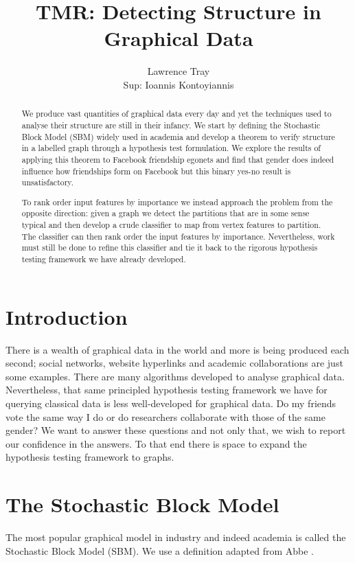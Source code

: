 \documentclass[]{article}
\title{TMR: Detecting Structure in Graphical Data}
\author{Lawrence Tray \\ Sup: Ioannis Kontoyiannis}
\begin{document}
\maketitle

\begin{abstract}
We produce vast quantities of graphical data every day and yet the techniques used to analyse their structure are still in their infancy. We start by defining the Stochastic Block Model (SBM) widely used in academia and develop a theorem to verify structure in a labelled graph through a hypothesis test formulation. We explore the results of applying this theorem to Facebook friendship egonets and find that gender does indeed influence how friendships form on Facebook but this binary yes-no result is unsatisfactory.

To rank order input features by importance we instead approach the problem from the opposite direction: given a graph we detect the partitions that are in some sense typical and then develop a crude classifier to map from vertex features to partition. The classifier can then rank order the input features by importance. Nevertheless, work must still be done to refine this classifier and tie it back to the rigorous hypothesis testing framework we have already developed.
\end{abstract}

\section{Introduction}

There is a wealth of graphical data in the world and more is being produced each second; social networks, website hyperlinks and academic collaborations are just some examples. There are many algorithms developed to analyse graphical data. Nevertheless, that same principled hypothesis testing framework we have for querying classical data is less well-developed for graphical data. Do my friends vote the same way I do or do researchers collaborate with those of the same gender? We want to answer these questions and not only that, we wish to report our confidence in the answers. To that end there is space to expand the hypothesis testing framework to graphs.

\section{The Stochastic Block Model}

The most popular graphical model in industry and indeed academia is called the Stochastic Block Model (SBM). We use a definition adapted from Abbe \cite{Abbe}.
\end{document}

